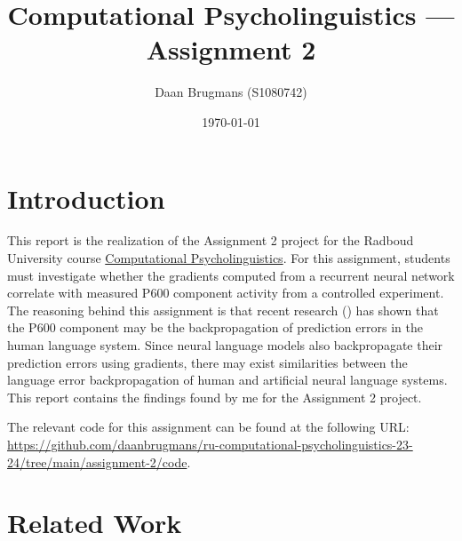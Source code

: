 \documentclass{IEEEtran}
\begin{document}
\title{Computational Psycholinguistics --- Assignment 2}
\author{Daan Brugmans (S1080742)}
\date{\today}

\graphicspath{{./images}}

\maketitle

\section{Introduction}
This report is the realization of the Assignment 2 project for the Radboud University course \href{https://www.ru.nl/courseguides/arts/courses/ma/rema-lc/let-rema-lcex28/}{Computational Psycholinguistics}.
For this assignment, students must investigate whether the gradients computed from a recurrent neural network correlate with measured P600 component activity from a controlled experiment.
The reasoning behind this assignment is that recent research (\cite{fitz2019erp,frank2024gradients}) has shown that the P600 component may be the backpropagation of prediction errors in the human language system.
Since neural language models also backpropagate their prediction errors using gradients, there may exist similarities between the language error backpropagation of human and artificial neural language systems.
This report contains the findings found by me for the Assignment 2 project.

The relevant code for this assignment can be found at the following URL: \url{https://github.com/daanbrugmans/ru-computational-psycholinguistics-23-24/tree/main/assignment-2/code}.

\section{Related Work}

\end{document}
